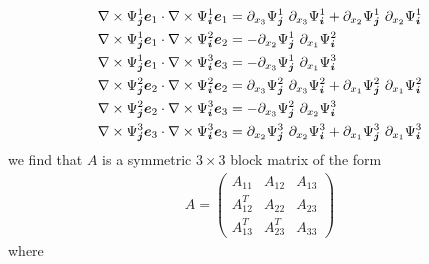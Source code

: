 \begin{align*}
 \nabla \times \Psi^{1}_{\bm{j}} \bm{e}_{1} \cdot \nabla \times \Psi^{1}_{\bm{i}} \bm{e}_{1} &=  
    \partial_{x_3} \Psi^{1}_{\bm{j}} ~ \partial_{x_3} \Psi^{1}_{\bm{i}} 
  + \partial_{x_2} \Psi^{1}_{\bm{j}} ~ \partial_{x_2} \Psi^{1}_{\bm{i}}
 \\
 \nabla \times \Psi^{1}_{\bm{j}} \bm{e}_{1} \cdot \nabla \times \Psi^{2}_{\bm{i}} \bm{e}_{2} &= 
 - \partial_{x_2} \Psi^{1}_{\bm{j}} ~ \partial_{x_1} \Psi^{2}_{\bm{i}}
 \\
 \nabla \times \Psi^{1}_{\bm{j}} \bm{e}_{1} \cdot \nabla \times \Psi^{3}_{\bm{i}} \bm{e}_{3} &=  
 - \partial_{x_3} \Psi^{1}_{\bm{j}} ~ \partial_{x_1} \Psi^{3}_{\bm{i}}
 \\
 \nabla \times \Psi^{2}_{\bm{j}} \bm{e}_{2} \cdot \nabla \times \Psi^{2}_{\bm{i}} \bm{e}_{2} &= 
   \partial_{x_3} \Psi^{2}_{\bm{j}} ~ \partial_{x_3} \Psi^{2}_{\bm{i}} 
 + \partial_{x_1} \Psi^{2}_{\bm{j}} ~ \partial_{x_1} \Psi^{2}_{\bm{i}}
 \\
 \nabla \times \Psi^{2}_{\bm{j}} \bm{e}_{2} \cdot \nabla \times \Psi^{3}_{\bm{i}} \bm{e}_{3} &=  
 - \partial_{x_3} \Psi^{2}_{\bm{j}} ~  \partial_{x_2} \Psi^{3}_{\bm{i}} 
 \\
 \nabla \times \Psi^{3}_{\bm{j}} \bm{e}_{3} \cdot \nabla \times \Psi^{3}_{\bm{i}} \bm{e}_{3} &=  
   \partial_{x_2} \Psi^{3}_{\bm{j}} ~ \partial_{x_2} \Psi^{3}_{\bm{i}} 
 + \partial_{x_1} \Psi^{3}_{\bm{j}} ~ \partial_{x_1} \Psi^{3}_{\bm{i}}
\end{align*}
we find that $A$ is a symmetric $3\times 3$ block matrix of the form
\begin{align}
  A = 
  \begin{pmatrix}
    A_{11}   & A_{12}   &  A_{13} \\
    A_{12}^T & A_{22}   &  A_{23} \\
    A_{13}^T & A_{23}^T &  A_{33} 
  \end{pmatrix}
\end{align}
where
